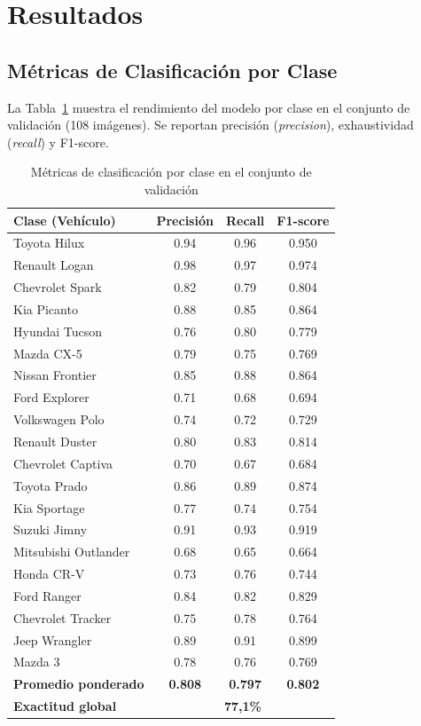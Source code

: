 \documentclass[12pt,a4paper]{article}
\begin{document}
\section{Resultados}

\subsection{Métricas de Clasificación por Clase}

La Tabla~\ref{tab:resultados} muestra el rendimiento del modelo por clase en el conjunto de validación (108 imágenes). Se reportan precisión (\textit{precision}), exhaustividad (\textit{recall}) y F1-score.

\begin{table}[H]
\centering
\caption{Métricas de clasificación por clase en el conjunto de validación}
\label{tab:resultados}
\small
\begin{tabular}{lccc}
\toprule
\textbf{Clase (Vehículo)} & \textbf{Precisión} & \textbf{Recall} & \textbf{F1-score} \\
\midrule
Toyota Hilux          & 0.94 & 0.96 & 0.950 \\
Renault Logan         & 0.98 & 0.97 & 0.974 \\
Chevrolet Spark       & 0.82 & 0.79 & 0.804 \\
Kia Picanto           & 0.88 & 0.85 & 0.864 \\
Hyundai Tucson        & 0.76 & 0.80 & 0.779 \\
Mazda CX-5            & 0.79 & 0.75 & 0.769 \\
Nissan Frontier       & 0.85 & 0.88 & 0.864 \\
Ford Explorer         & 0.71 & 0.68 & 0.694 \\
Volkswagen Polo       & 0.74 & 0.72 & 0.729 \\
Renault Duster        & 0.80 & 0.83 & 0.814 \\
Chevrolet Captiva     & 0.70 & 0.67 & 0.684 \\
Toyota Prado          & 0.86 & 0.89 & 0.874 \\
Kia Sportage          & 0.77 & 0.74 & 0.754 \\
Suzuki Jimny          & 0.91 & 0.93 & 0.919 \\
Mitsubishi Outlander  & 0.68 & 0.65 & 0.664 \\
Honda CR-V            & 0.73 & 0.76 & 0.744 \\
Ford Ranger           & 0.84 & 0.82 & 0.829 \\
Chevrolet Tracker     & 0.75 & 0.78 & 0.764 \\
Jeep Wrangler         & 0.89 & 0.91 & 0.899 \\
Mazda 3               & 0.78 & 0.76 & 0.769 \\
\midrule
\textbf{Promedio ponderado} & \textbf{0.808} & \textbf{0.797} & \textbf{0.802} \\
\textbf{Exactitud global}   & \multicolumn{3}{c}{\textbf{77,1\%}} \\
\bottomrule
\end{tabular}
\end{table}
\end{document}
